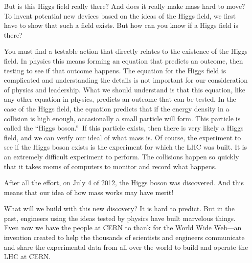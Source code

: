 \documentclass{article}
\begin{document}
But is this Higgs field really there? And does it really make mass hard to
move? To invent potential new devices based on the ideas of the Higgs field,
we first have to show that such a field exists. But how can you know if a
Higgs field is there?

You must find a testable action that directly relates to the existence of
the Higgs field. In physics this means forming an equation that predicts an
outcome, then testing to see if that outcome happens. The equation for the Higgs field
is complicated and understanding the details is not important for our
consideration of physics and leadership. What we should understand is that
this equation, like any other equation in physics, predicts an outcome that
can be tested. In the case of the Higgs field, the equation predicts that if
the energy density in a collision is high enough, occasionally a small
particle will form. This particle is called the \textquotedblleft Higgs
boson.\textquotedblright\ If this particle exists, then there is very likely
a Higgs field, and we can verify our ideal of what mass is. Of course, the
experiment to see if the Higgs boson exists is the experiment for which the
LHC was built. It is an extremely difficult experiment to perform. The
collisions happen so quickly that it takes rooms of computers to monitor and
record what happens.


After all the effort, on July 4 of 2012, the Higgs boson was discovered. And
this means that our idea of how mass works may have merit!

What will we build with this new discovery? It is hard to predict. But in
the past, engineers using the ideas tested by physics have built marvelous
things. Even now we have the people at CERN to thank for the World Wide
Web---an invention created to help the thousands of scientists and engineers
communicate and share the experimental data from all over the world to build
and operate the LHC at CERN.
\end{document}
